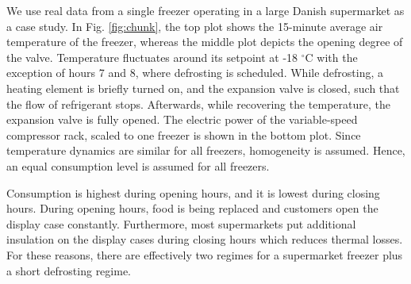 
We use real data from a single freezer operating in a large Danish supermarket as a case study.
In Fig. \ref{fig:chunk}, the top plot shows the 15-minute average air temperature of the freezer, whereas the middle plot depicts the opening degree of the valve.
%
Temperature fluctuates around its setpoint at -18 $^{\circ}$C with the exception of hours 7 and 8, where defrosting is scheduled.
While defrosting, a heating element is briefly turned on, and the expansion valve is closed, such that the flow of refrigerant stops. Afterwards, while recovering the temperature, the expansion valve is fully opened.
The electric power of the variable-speed compressor rack, scaled to one freezer is shown in the bottom plot. Since temperature dynamics are similar for all freezers, homogeneity is assumed. Hence, an equal consumption level is assumed for all freezers.

Consumption is highest during opening hours, and it is lowest during closing hours.
During opening hours, food is being replaced and customers open the display case constantly.
Furthermore, most supermarkets put additional insulation on the display cases during closing hours which reduces thermal losses.
For these reasons, there are effectively two regimes for a supermarket freezer plus a short defrosting regime.

